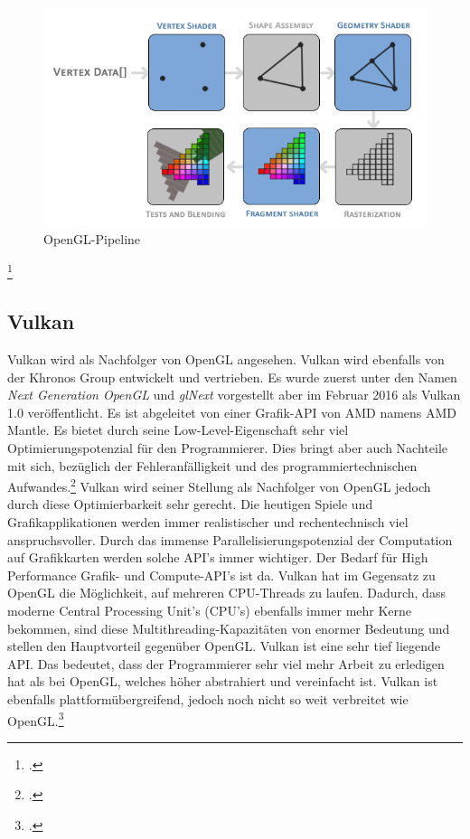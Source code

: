 \documentclass[titlepage, 11pt, a4paper, ngerman]{article}
\begin{document}
\begin{figure}[ht]
    \centering
    \includegraphics[scale=2]{res/oglpipeline.png}
    \caption[\acrshort{OpenGL}-Pipeline]{\acrshort{OpenGL}-Pipeline\footnotemark}
    \label{fig:opengl-pipe}
\end{figure}
\footcitetext{ogl-pipeline-logl}

\subsection{Vulkan}
Vulkan wird als Nachfolger von \acrshort{OpenGL} angesehen. Vulkan wird ebenfalls von der Khronos Group entwickelt und vertrieben. Es wurde zuerst unter den Namen \textit{Next Generation \acrshort{OpenGL}} und \textit{glNext} vorgestellt aber im Februar 2016 als Vulkan 1.0 veröffentlicht. Es ist abgeleitet von einer Grafik-\acrshort{API} von AMD namens AMD Mantle. Es bietet durch seine Low-Level-Eigenschaft sehr viel Optimierungspotenzial für den Programmierer. Dies bringt aber auch Nachteile mit sich, bezüglich der Fehleranfälligkeit und des programmiertechnischen Aufwandes.\footcite{vktut-intro} Vulkan wird seiner Stellung als Nachfolger von \acrshort{OpenGL} jedoch durch diese Optimierbarkeit sehr gerecht. Die heutigen Spiele und Grafikapplikationen werden immer realistischer und rechentechnisch viel anspruchsvoller. Durch das immense Parallelisierungspotenzial der Computation auf Grafikkarten werden solche \acrshort{API}'s immer wichtiger. Der Bedarf für High Performance Grafik- und Compute-\acrshort{API}'s ist da. Vulkan hat im Gegensatz zu \acrshort{OpenGL} die Möglichkeit, auf mehreren \acrshort{CPU}-\glspl{Thread} zu laufen. Dadurch, dass moderne Central Processing Unit's (\acrshort{CPU}'s) ebenfalls immer mehr Kerne bekommen, sind diese \gls{Multithreading}-Kapazitäten von enormer Bedeutung und stellen den Hauptvorteil gegenüber \acrshort{OpenGL}. Vulkan ist eine sehr tief liegende \acrshort{API}. Das bedeutet, dass der Programmierer sehr viel mehr Arbeit zu erledigen hat als bei \acrshort{OpenGL}, welches höher abstrahiert und vereinfacht ist. Vulkan ist ebenfalls plattformübergreifend, jedoch noch nicht so weit verbreitet wie \acrshort{OpenGL}.\footcite{khronos-vulkan}
\end{document}
